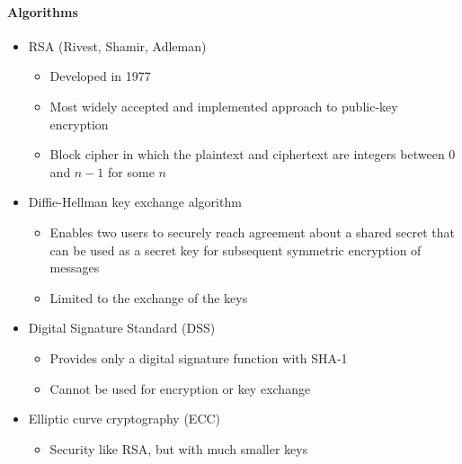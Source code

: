 \documentclass{article}
\begin{document}
                                    \paragraph{Algorithms}
                                    \begin{itemize}
                                        \item RSA (Rivest, Shamir, Adleman)
                                        \begin{itemize}
                                            \item Developed in 1977
                                            \item Most widely accepted and implemented approach to public-key encryption
                                            \item Block cipher in which the plaintext and ciphertext are integers between 0 and \(n-1\) for some \(n\)
                                        \end{itemize}
                                        \item Diffie-Hellman key exchange algorithm
                                        \begin{itemize}
                                            \item Enables two users to securely reach agreement about a shared secret that can be used as a secret key for subsequent symmetric encryption of messages
                                            \item Limited to the exchange of the keys
                                        \end{itemize}
                                        \item Digital Signature Standard (DSS)
                                        \begin{itemize}
                                            \item Provides only a digital signature function with SHA-1
                                            \item Cannot be used for encryption or key exchange
                                        \end{itemize}
                                        \item Elliptic curve cryptography (ECC)
                                        \begin{itemize}
                                            \item Security like RSA, but with much smaller keys
                                        \end{itemize}
                                    \end{itemize}
\end{document}
